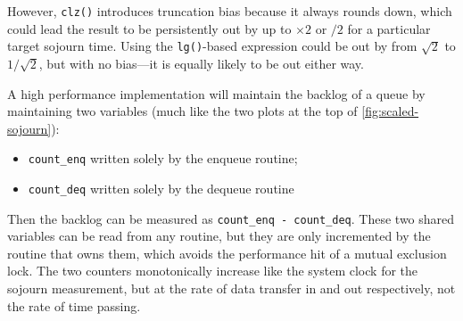 However, \texttt{clz()} introduces truncation bias because it always rounds down, which could lead the result to be persistently out by up to \(\times2\) or \(/2\) for a particular target sojourn time. Using the \texttt{lg()}-based expression could be out by from \(\sqrt{2}\) to \(1/\sqrt{2}\), but with no bias---it is equally likely to be out either way.

A high performance implementation will maintain the backlog of a queue by maintaining two variables (much like the two plots at the top of \autoref{fig:scaled-sojourn}):
\begin{itemize}[nosep]
	\item[] \texttt{count\_enq} written solely by the enqueue routine;
	\item[] \texttt{count\_deq} written solely by the dequeue routine
\end{itemize}	
Then the backlog can be measured as \texttt{count\_enq - count\_deq}. These two shared variables can be read from any routine, but they are only incremented by the routine that owns them, which avoids the performance hit of a mutual exclusion lock. The two counters monotonically increase like the system clock for the sojourn measurement, but at the rate of data transfer in and out respectively, not the rate of time passing. 

